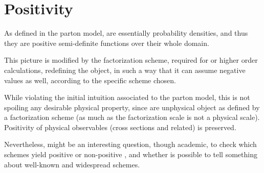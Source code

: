 
\chapter{Positivity}
\label{ch:pos}
\minitoc
\adjustmtc
\bigskip


\noindent
As defined in the parton model, \pdf are essentially probability densities, and
thus they are positive semi-definite functions over their whole domain.

This picture is modified by the factorization scheme, required for \nlo or
higher order calculations, redefining the \pdf object, in such a way that it
can assume negative values as well, according to the specific scheme chosen.

While violating the initial intuition associated to the parton model, this is
not spoiling any desirable physical property, since \pdf are unphysical object
as defined by a factorization scheme (as much as the factorization scale is not
a physical scale).
Positivity of physical observables (cross sections and related) is preserved. 

Nevertheless, might be an interesting question, though academic, to check which
schemes yield positive or non-positive \pdf, and whether is possible to tell
something about well-known and widespread schemes.






